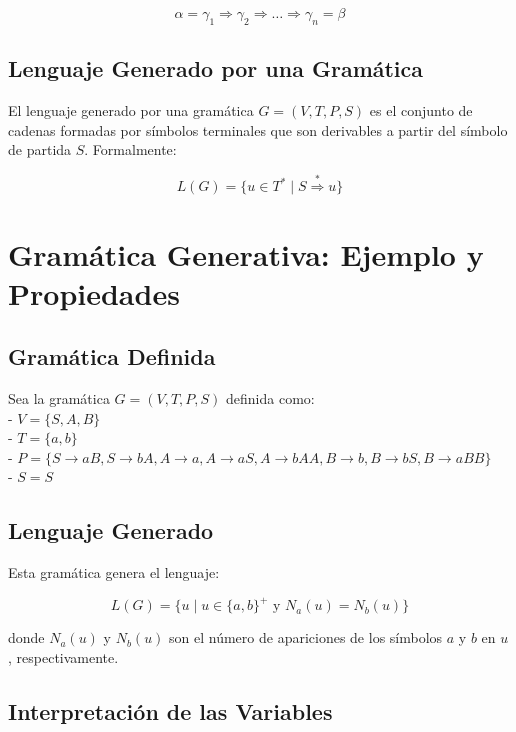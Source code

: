 \documentclass[12pt]{report} %
\begin{document}
\[
\alpha = \gamma_1 \Rightarrow \gamma_2 \Rightarrow \ldots \Rightarrow \gamma_n = \beta
\]

\hypertarget{lenguaje-generado-por-una-gramuxe1tica}{%
\subsection{Lenguaje Generado por una
Gramática}\label{lenguaje-generado-por-una-gramuxe1tica}}

El lenguaje generado por una gramática \(G = (V, T, P, S)\) es el
conjunto de cadenas formadas por símbolos terminales que son derivables
a partir del símbolo de partida \(S\). Formalmente:

\[
L(G) = \{u \in T^* \mid S \overset{*}{\Rightarrow} u\}
\]

\hypertarget{gramuxe1tica-generativa-ejemplo-y-propiedades}{%
\section{Gramática Generativa: Ejemplo y
Propiedades}\label{gramuxe1tica-generativa-ejemplo-y-propiedades}}

\hypertarget{gramuxe1tica-definida}{%
\subsection{Gramática Definida}\label{gramuxe1tica-definida}}

Sea la gramática \(G = (V, T, P, S)\) definida como:\\
- \(V = \{S, A, B\}\)\\
- \(T = \{a, b\}\)\\
-
\(P = \{S \to aB, S \to bA, A \to a, A \to aS, A \to bAA, B \to b, B \to bS, B \to aBB\}\)\\
- \(S = S\)

\hypertarget{lenguaje-generado}{%
\subsection{Lenguaje Generado}\label{lenguaje-generado}}

Esta gramática genera el lenguaje:

\[
L(G) = \{u \mid u \in \{a, b\}^+ \text{ y } N_a(u) = N_b(u)\}
\]

donde \(N_a(u)\) y \(N_b(u)\) son el número de apariciones de los
símbolos \(a\) y \(b\) en \(u\), respectivamente.

\hypertarget{interpretaciuxf3n-de-las-variables}{%
\subsection{Interpretación de las
Variables}\label{interpretaciuxf3n-de-las-variables}}
\end{document}
